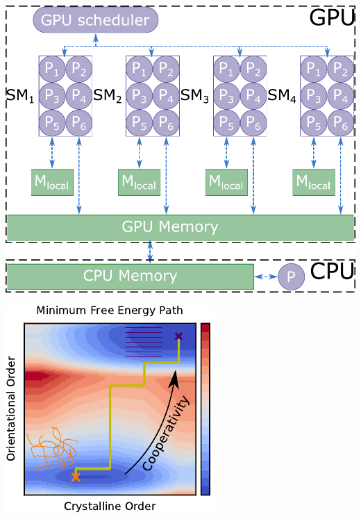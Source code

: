 \documentclass[aspectratio=169]{beamer}
\begin{document}
\begin{frame}[c]{}

  \centering
  \includegraphics[height=\textheight]{../figures/ch3_gpu/fig-GPU_arch/fig-GPU_arch.pdf}

\end{frame}

\begin{frame}[c]{}

  \centering
  \includegraphics[height=\textheight]{../figures/ch4_jcp_from_diss/fig-pathway_ToC_chains/fig-pathway_ToC_chains.pdf}

\end{frame}
\end{document}
